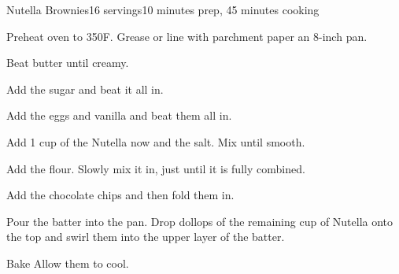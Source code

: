 \documentclass[../Cookbook.tex]{subfiles}
\begin{document}
\begin{recipe}{Nutella Brownies}{16 servings}{10 minutes prep, 45 minutes cooking}

	Preheat oven to 350\0F. Grease or line with parchment paper an 8-inch pan.

	Beat butter until creamy.

	Add the sugar and beat it all in.

	Add the eggs and vanilla and beat them all in.

	Add 1 cup of the Nutella now and the salt. Mix until smooth.

	Add the flour. Slowly mix it in, just until it is fully combined.

	Add the chocolate chips and then fold them in.

	Pour the batter into the pan. Drop dollops of the remaining  cup of Nutella onto the top and swirl them into the upper layer of the batter.

	\newstep
	Bake  Allow them to cool.

\end{recipe}
\end{document}
